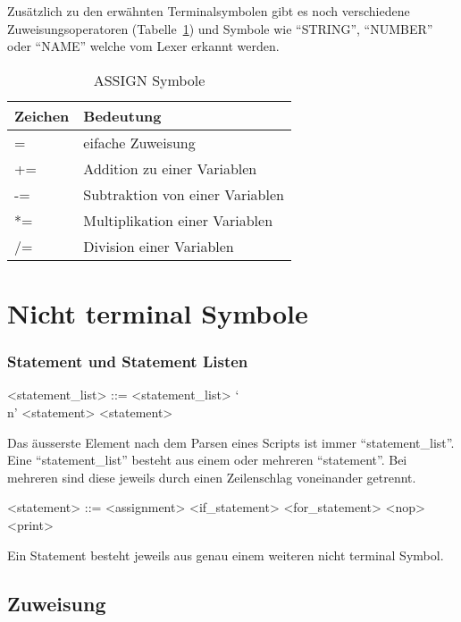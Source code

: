 Zusätzlich zu den erwähnten Terminalsymbolen gibt es noch verschiedene Zuweisungsoperatoren (Tabelle~\ref{tab:assign}) und Symbole wie ``STRING'', ``NUMBER'' oder ``NAME'' welche vom Lexer erkannt werden.

\begin{table}[h!]
  \centering
  \begin{tabular}{ll}
  \toprule
    Zeichen & Bedeutung\\
  \midrule
    = & eifache Zuweisung \\
  \hline
    += & Addition zu einer Variablen \\
  \hline
    -= & Subtraktion von einer Variablen \\
  \hline
    *= & Multiplikation einer Variablen \\
  \hline
    /= & Division einer Variablen \\
  \bottomrule
  \end{tabular}
  \caption{ASSIGN Symbole}
  \label{tab:assign}
\end{table}

\pagebreak

\section{Nicht terminal Symbole}
\label{sec:nicht_terminal_symbole}
\subsubsection{Statement und Statement Listen}
\label{ssub:statement_und_statement_listen}
\begin{grammar}
<statement\_list> ::= <statement\_list> `\\n' <statement>
\alt <statement>
\end{grammar}

Das äusserste Element nach dem Parsen eines Scripts ist immer ``statement\_list''. Eine ``statement\_list'' besteht aus einem oder mehreren ``statement''. Bei mehreren sind diese jeweils durch einen Zeilenschlag voneinander getrennt.

\begin{grammar}
<statement> ::= <assignment>
\alt <if_statement>
\alt <for_statement>
\alt <nop>
\alt <print>  
\end{grammar}

Ein Statement besteht jeweils aus genau einem weiteren nicht terminal Symbol.

\subsection{Zuweisung}
\label{sub:zuweisung}

